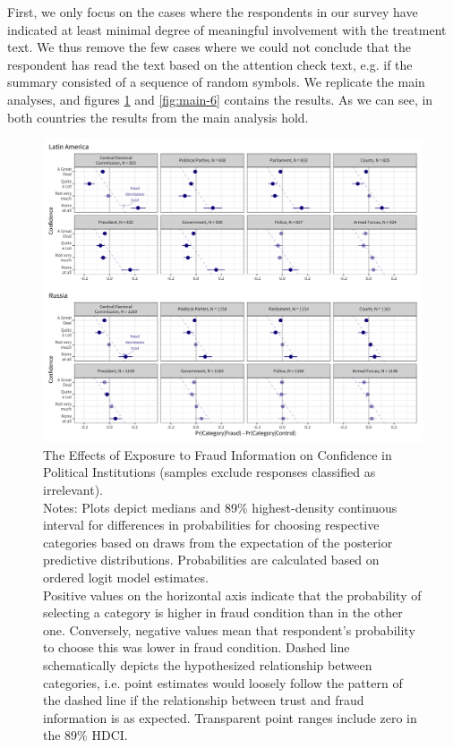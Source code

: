 \documentclass[11pt, ngerman,english,a4]{article}
\begin{document}
% 

% 

First, we only focus on the cases where the respondents in our survey have indicated at least minimal degree of meaningful involvement with the treatment text. We thus remove the few cases where we could not conclude that the respondent has read the text based on the attention check text, e.g. if the summary consisted of a sequence of random symbols. We replicate the main analyses, and figures \ref{fig:main-2} and \ref{fig:main-6} contains the results. As we can see, in both countries the results from the main analysis hold. 

\begin{figure}[H]
	\centering
	\includegraphics[width=\linewidth,trim=4 4 4 4,clip]{figs/main_hdi89_2.png}
	\caption{The Effects of Exposure to Fraud Information on Confidence in Political Institutions (samples exclude responses classified as irrelevant).  \\
		\footnotesize{Notes: Plots depict medians and 89\% highest-density continuous interval for differences in probabilities for choosing respective categories based on draws from the expectation of the posterior predictive distributions. Probabilities are calculated based on ordered logit model estimates.\\
			Positive values on the horizontal axis indicate that the probability of selecting a category is higher in fraud condition than in the other one. Conversely, negative values mean that respondent's probability to choose this was lower in fraud condition. Dashed line schematically depicts the hypothesized relationship between categories, i.e. point estimates would loosely follow the pattern of the dashed line if the relationship between trust and fraud information is as expected. Transparent point ranges include zero in the 89\% HDCI.\\
	} }
	\singlespacing
	\raggedright
	\label{fig:main-2}
\end{figure}
    
\end{document}
